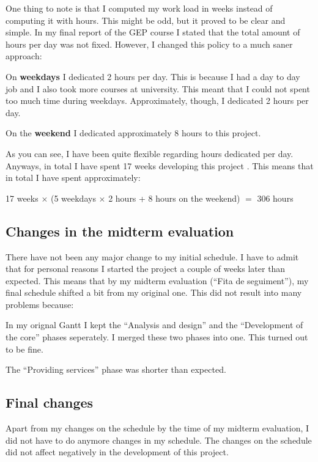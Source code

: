 One thing to note is that I computed my work load in weeks instead of computing
it with hours. This might be odd, but it proved to be clear and simple. In my
final report of the GEP course I stated that the total amount of hours per day
was not fixed. However, I changed this policy to a much saner approach:

\mylist
  \item On {\bf weekdays} I dedicated 2 hours per day. This is because I had a
day to day job and I also took more courses at university. This meant that I
could not spent too much time during weekdays. Approximately, though, I
dedicated 2 hours per day.
  \item On the {\bf weekend} I dedicated approximately 8 hours to this project.
\mylistend

As you can see, I have been quite flexible regarding hours dedicated per day.
Anyways, in total I have spent 17 weeks developing this project . This means
that in total I have spent approximately:

\begin{center}
  17 weeks $\times$ (5 weekdays $\times$ 2 hours + 8 hours on the
weekend) $=$ 306 hours
\end{center}

\subsection{Changes in the midterm evaluation}

There have not been any major change to my initial schedule. I have to admit
that for personal reasons I started the project a couple of weeks later
than expected. This means that by my midterm evaluation (``Fita de
seguiment''), my final schedule shifted a bit from my original one. This did not
result into many problems because:

\mylist
  \item In my orignal Gantt I kept the ``Analysis and design'' and the
``Development of the core'' phases seperately. I merged these two phases into
one. This turned out to be fine.
  \item The ``Providing services'' phase was shorter than expected.
\mylistend

\subsection{Final changes}

Apart from my changes on the schedule by the time of my midterm evaluation, I
did not have to do anymore changes in my schedule. The changes on the schedule
did not affect negatively in the development of this project.

